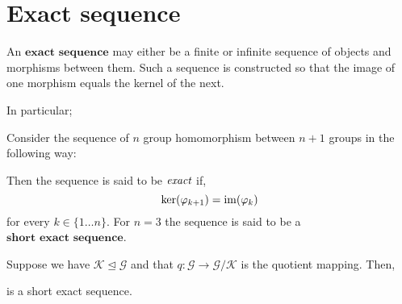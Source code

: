 \section{Exact sequence} %
\label{sec:exactsequence}
An $\textbf{exact sequence}$ may  either be a finite or infinite sequence of objects and morphisms between them.
Such a sequence is constructed so that the image of one morphism equals the kernel of the next.

In particular;

\begin{defn}
	Consider the sequence of $n$ group homomorphism between $n+1$ groups
	in the following way:

	\begin{center}
\end{center}

Then the sequence is said to be $\emph{exact}$ if,
\[
	\ker(\varphi_{k+1}) = \operatorname{im}(\varphi_{k})
\]
for every $k \in \{1 \dots n\}$. For $n=3$ the sequence is said to be a
$\textbf{short exact sequence}$.
\end{defn}

\begin{exmp}
	Suppose we have $\mathcal{K} \unlhd \mathcal{G}$ and that
	$q: \mathcal{G} \to \mathcal{G} / \mathcal{K}$ is the quotient mapping.
	Then,
	\begin{center}
\end{center}
is a short exact sequence.
\end{exmp}
